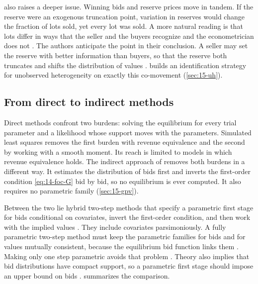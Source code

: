  also raises a deeper issue. Winning bids and reserve prices move in tandem. If the reserve
were an exogenous truncation point, variation in reserves would change the fraction of lots sold, yet every lot was
sold. A more natural reading is that lots differ in ways that the seller and the buyers recognize and the
econometrician does not \citep[p.~7]{Roberts2013}. The authors anticipate the point in their conclusion. A seller may
set the reserve with better information than buyers, so that the reserve both truncates and shifts the distribution
of values \citep[p.~973]{LaffontOssardVuong1995}. \citet{Roberts2013} builds an identification strategy for
unobserved heterogeneity on exactly this co-movement (\cref{sec:15-uh}).

\subsection{From direct to indirect methods}\label{sec:15-direct-indirect}

Direct methods confront two burdens: solving the equilibrium for every trial parameter and a likelihood whose
support moves with the parameters. Simulated least squares removes the first burden with revenue equivalence and the
second by working with a smooth moment. Its reach is limited to models in which revenue equivalence holds. The
indirect approach of \citet{GuerrePerrigneVuong2000} removes both burdens in a different way. It estimates the
distribution of bids first and inverts the first-order condition \eqref{eq:14-foc-G} bid by bid, so no equilibrium is
ever computed. It also requires no parametric family (\cref{sec:15-gpv}).

Between the two lie hybrid two-step methods that specify a parametric first stage for bids conditional on
covariates, invert the first-order condition, and then work with the implied values
\citep{JofreBonetPesendorfer2003,AtheyLevinSeira2011}. They include covariates parsimoniously. A fully parametric
two-step method must keep the parametric families for bids and for values mutually consistent, because the
equilibrium bid function links them \citep{PerrigneVuong1999}. Making only one step parametric avoids that problem
\citep[Section~3.2]{AtheyHaile2007}. Theory also implies that bid distributions have compact support, so a parametric
first stage should impose an upper bound on bids \citep[footnote~19]{AtheyHaile2007}. 
summarizes the comparison.

